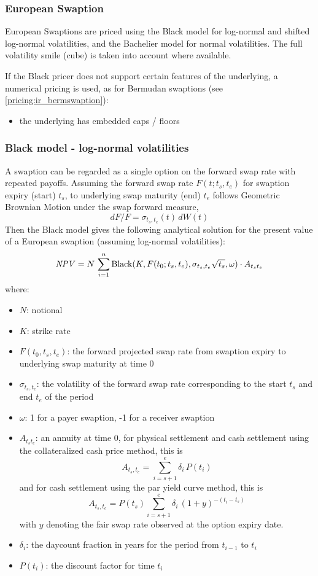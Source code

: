 \subsubsection{European Swaption}
\label{pricing:ir_euroswaption}

European Swaptions are priced using the Black model for log-normal and shifted
log-normal volatilities, and the Bachelier model for normal volatilities. The 
full volatility smile (cube) is taken into account where available.

If the Black pricer does not support certain features of the underlying, a numerical pricing is used, as for
Bermudan swaptions (see \ref{pricing:ir_bermswaption}):

\begin{itemize}
\item the underlying has embedded caps / floors
\end{itemize}

\subsubsection*{Black model - log-normal volatilities}

A swaption can be regarded as a single option on the forward swap rate with 
repeated payoffs. Assuming the forward swap rate $F(t;t_s, t_e)$ for swaption 
expiry (start) $t_s$, to underlying swap maturity (end) $t_e$ follows 
Geometric Brownian Motion under the swap forward measure,
$$
dF / F = \sigma_{t_s,t_e}(t)\,dW(t)
$$
Then the Black model gives the following analytical solution for the present 
value of a European swaption (assuming log-normal volatilities):
$$
\mathit{NPV} = N \,\sum_{i=1}^n \mbox{Black}(K, F(t_0; t_s,t_e), \sigma_{t_s,t_e} \sqrt{t_s},\omega)\cdot A_{t_s t_e}
$$
where:
\begin{itemize}
\item $N$: notional
\item $K$: strike rate
\item $F(t_0,t_s,t_e)$: the forward projected swap rate from swaption expiry 
to underlying swap maturity at time 0 
\item $\sigma_{t_s,t_e}$: the volatility of the forward swap rate corresponding 
to the start $t_s$ and end $t_e$ of the period
\item $\omega$: 1 for a payer swaption, -1 for a receiver swaption
\item $A_{t_s t_e}$: an annuity at time 0, for physical settlement and cash settlement using the collateralized cash
  price method, this is
$$
A_{t_s, t_e} = \sum_{i=s+1}^e \delta_i\,P(t_i) 
$$
and for cash settlement using the par yield curve method, this is
$$
A_{t_s, t_e} = P(t_s) \sum_{i=s+1}^e \delta_i\,(1+y)^{-(t_i-t_s)}
$$
with $y$ denoting the fair swap rate observed at the option expiry date.
\item $\delta_i$: the daycount fraction in years for the period from $t_{i-1}$ to $t_i$
\item $P(t_i)$: the discount factor for time $t_i$
\end{itemize}

